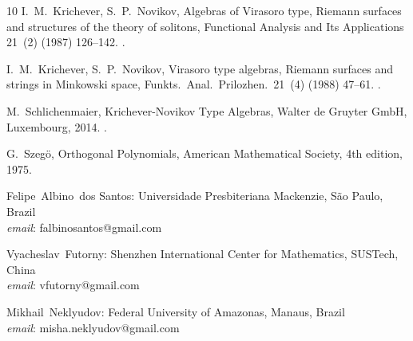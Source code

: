 \documentclass[final,nopreprintline]{elsarticle}
\theoremstyle{definition}
\numberwithin{equation}{section}
\theoremstyle{remark}
\begin{document}
\begin{thebibliography}{10}
I.~M.~Krichever, S.~P.~Novikov,
{Algebras of Virasoro type, Riemann surfaces and structures of the theory of solitons},
Functional Analysis and Its Applications 21~(2) (1987) 126--142.
\newblock \href{https://doi.org/10.1007/BF01078026}{}.

I.~M.~Krichever, S.~P.~Novikov,
{Virasoro type algebras, Riemann surfaces and strings in Minkowski space},
Funkts.\ Anal.\ Prilozhen.\ 21~(4) (1988) 47--61.
\newblock \href{https://doi.org/10.1007/BF01077803}{}.

M.~Schlichenmaier,
{Krichever-Novikov Type Algebras},
Walter de Gruyter GmbH, Luxembourg, 2014.
\newblock \href{https://doi.org/10.1515/9783110279641}{}.

G.~Szeg\"{o},
{Orthogonal Polynomials},
American Mathematical Society, 4th edition, 1975.

\end{thebibliography}

\bigskip

Felipe~Albino~dos Santos: Universidade Presbiteriana Mackenzie, S\~{a}o Paulo, Brazil\\
\textit{email}: falbinosantos@gmail.com

\medskip
Vyacheslav~Futorny: Shenzhen International Center for Mathematics, SUSTech, China\\
\textit{email}: vfutorny@gmail.com

\medskip
Mikhail~Neklyudov: Federal University of Amazonas, Manaus, Brazil\\
\textit{email}: misha.neklyudov@gmail.com
\end{document}
